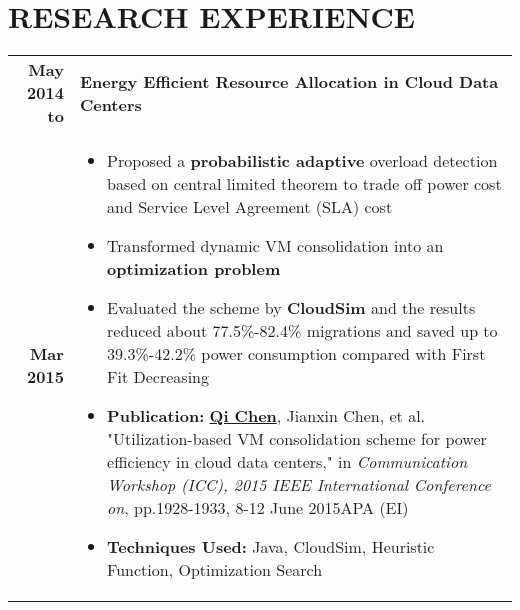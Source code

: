 \documentclass[a4paper, 11pt]{extarticle} %
\begin{document}
\section{RESEARCH EXPERIENCE}
\vspace{-0.3cm}
\begin{longtable}{r | p{16cm}}
			\textbf{May 2014 to}
		 &
		 \textbf{Energy Efficient Resource Allocation in Cloud Data Centers}  \\
		
			\textbf{Mar 2015}
		

%		
&

\small{

\vspace{-0.3cm}

\begin{itemize}[leftmargin=*]
\item Proposed a \textbf{probabilistic adaptive} overload detection based on central limited theorem to trade off power cost and Service Level Agreement (SLA) cost
\item Transformed dynamic VM consolidation into an \textbf{optimization problem}
\item Evaluated the scheme by \textbf{CloudSim} and the results reduced about 77.5\%-82.4\% migrations and saved up to 39.3\%-42.2\% power consumption compared with First Fit Decreasing
\item \textbf{Publication:} \underline{\textbf{Qi Chen}}, Jianxin Chen, et al. "Utilization-based VM consolidation scheme for power efficiency in cloud data centers," in \emph{Communication Workshop (ICC), 2015 IEEE International Conference on}, pp.1928-1933, 8-12 June 2015APA (EI)
\item \textbf{Techniques Used:} Java, CloudSim, Heuristic Function, Optimization Search
\vspace{-0.3cm}

\end{itemize}

}\\

\end{longtable}

\vspace{-0.5cm}
\end{document}
